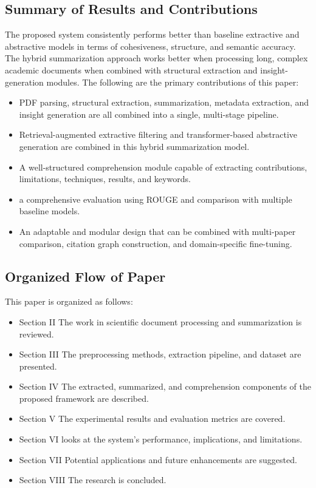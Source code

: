 \documentclass[conference]{IEEEtran}
\begin{document}
\subsection{Summary of Results and Contributions}
The proposed system consistently performs better than baseline extractive and abstractive models in terms of cohesiveness, structure, and semantic accuracy. The hybrid summarization approach works better when processing long, complex academic documents when combined with structural extraction and insight-generation modules. The following are the primary contributions of this paper:
\begin{itemize}
    \item PDF parsing, structural extraction, summarization, metadata extraction, and insight generation are all combined into a single, multi-stage pipeline.
    \item Retrieval-augmented extractive filtering and transformer-based abstractive generation are combined in this hybrid summarization model.
    \item A well-structured comprehension module capable of extracting contributions, limitations, techniques, results, and keywords.
    \item  a comprehensive evaluation using ROUGE and comparison with multiple baseline models.
    \item An adaptable and modular design that can be combined with multi-paper comparison, citation graph construction, and domain-specific fine-tuning.
\end{itemize}
\subsection{Organized Flow of Paper}
This paper is organized as follows:
\begin{itemize}
    \item Section II The work in scientific document processing and summarization is reviewed.
    \item Section III The preprocessing methods, extraction pipeline, and dataset are presented.
    \item Section IV The extracted, summarized, and comprehension components of the proposed framework are described.
    \item Section V The experimental results and evaluation metrics are covered.
    \item Section VI looks at the system's performance, implications, and limitations.
    \item Section VII Potential applications and future enhancements are suggested.
    \item Section VIII The research is concluded.
\end{itemize}
\end{document}
